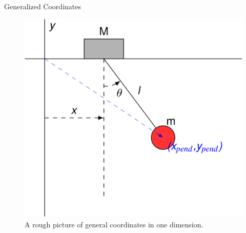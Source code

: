 \documentclass[usenames,dvipsnames]{beamer}
\theoremstyle{definition}
\theoremstyle{theorem}
\begin{document}
        \begin{frame}{Generalized Coordinates}
            \begin{figure}
                \centering
                \includegraphics[width=.6\textwidth]{Lagrangian_Mechanics/generalized_coordinates.png}
                \caption{A rough picture of general coordinates in one dimension.}
                \label{fig:my_label}
            \end{figure}
        \end{frame}
        
\end{document}
